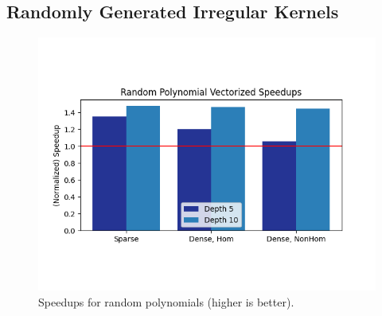 \subsection{Randomly Generated Irregular Kernels}
\begin{figure}[t]
	\centering
    \includegraphics[width=\linewidth]{figures/graphs/trees.png}
    \vspace{-5em}
    \caption{Speedups for random polynomials (higher is better).}\label{fig:polynomial-speedups}
\end{figure}

